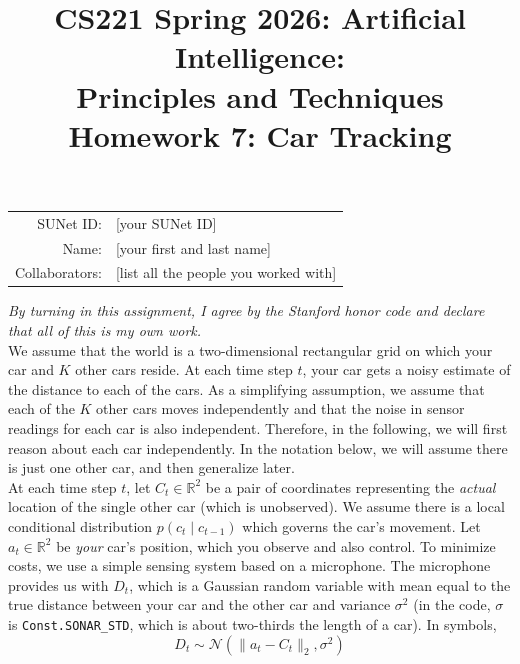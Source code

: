 \documentclass{article}
\title{\textbf{CS221 Spring 2026: Artificial Intelligence:\\ Principles and Techniques} \\Homework 7: Car Tracking}
\date{}
\theoremstyle{case}
\theoremstyle{definition}
\begin{document}
  
\maketitle


\begin{center}
\begin{tabular}{rl}
SUNet ID: & [your SUNet ID] \\
Name: & [your first and last name] \\
Collaborators: & [list all the people you worked with]
\end{tabular}
\end{center}

\fontsize{12pt}{16pt}\selectfont


\textit{By turning in this assignment, I agree by the Stanford honor code and declare that all of this is my own work.} \\



We assume that the world is a two-dimensional rectangular grid
on which your car and $K$ other cars reside.
At each time step $t$, your car gets a noisy estimate
of the distance to each of the cars.  As a simplifying assumption, we
assume that each of the $K$ other cars moves independently and
that the noise in sensor readings for each car is also independent.
Therefore, in the following, we will first reason about each car independently.
In the notation below, we will assume there is just one other car, and then generalize later. \\

At each time step $t$, let $C_t \in \mathbb R^2$
be a pair of coordinates representing the \textit{actual} location of
the single other car (which is unobserved).
We assume there is a local conditional distribution $p(c_t \mid c_{t-1})$ which
governs the car's movement.
Let $a_t \in \mathbb R^2$ be \textit{your} car's position,
which you observe and also control.
To minimize costs, we use a simple sensing system based on a microphone.
The microphone provides us with $D_t$,
which is a Gaussian random variable with mean equal
to the true distance between your car and the other car
and variance $\sigma^2$ (in the code, $\sigma$ is \texttt{Const.SONAR\_STD}, which
is about two-thirds the length of a car).
In symbols, 
$$D_t \sim \mathcal N(\|a_t - C_t\|_2, \sigma^2)$$
\end{document}
